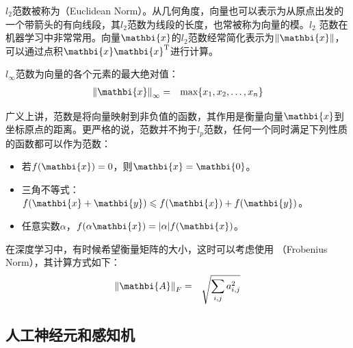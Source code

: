 \parinterval $ l_2 $范数被称为{\small{}}（Euclidean Norm）。从几何角度，向量也可以表示为从原点出发的一个带箭头的有向线段，其$ l_2 $范数为线段的长度，也常被称为向量的模。$ l_2 $ 范数在机器学习中非常常用。向量$ {\mathbi{x}} $的$ l_2 $范数经常简化表示为$ \Vert{\mathbi{x}}\Vert $，可以通过点积$ {{\mathbi{x}} \mathbi{x}}^{\textrm T} $进行计算。

\parinterval $ l_{\infty} $范数为向量的各个元素的最大绝对值：
\begin{eqnarray}
{\Vert{\mathbi{x}}\Vert}_{\infty}&=&{\textrm{max}}\{x_1,x_2,\dots,x_n\}
\label{eq:9-17}
\end{eqnarray}

\parinterval 广义上讲，范数是将向量映射到非负值的函数，其作用是衡量向量$ {\mathbi{x}} $到坐标原点的距离。更严格的说，范数并不拘于$ l_p $范数，任何一个同时满足下列性质的函数都可以作为范数：

\begin{itemize}
\vspace{0.5em}
\item 若$ f({\mathbi{x}})=0 $，则$ {\mathbi{x}}={\mathbi{0}} $。
\vspace{0.5em}
\item 三角不等式：$ f({\mathbi{x}}+{\mathbi{y}})\leqslant f({\mathbi{x}})+f({\mathbi{y}}) $。
\vspace{0.5em}
\item 任意实数$ \alpha $，$ f(\alpha {\mathbi{x}})=\vert \alpha \vert f({\mathbi{x}}) $。
\vspace{0.5em}
\end{itemize}

\parinterval 在深度学习中，有时候希望衡量矩阵的大小，这时可以考虑使用 {\small{}}（Frobenius Norm），其计算方式如下：
\begin{eqnarray}
{\Vert{\mathbi{A}}\Vert}_F&=&\sqrt{\sum_{i,j} a_{i,j}^2}
\label{eq:9-18}
\end{eqnarray}

\subsection{人工神经元和感知机}

